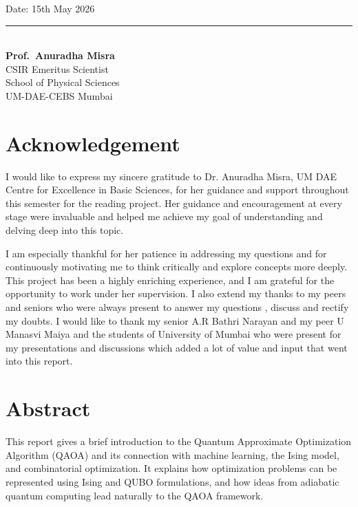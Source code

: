 \documentclass[english,12pt,a4paper]{report}
\begin{document}
	\noindent Date: 15th May 2026
	
	\begin{flushright}
		\rule{5cm}{0.4pt}\\
		\textbf{Prof.\ Anuradha Misra}\\
		CSIR Emeritus Scientist\\
		School of Physical Sciences\\
		UM-DAE-CEBS Mumbai
	\end{flushright}
	\newpage
	
	\section*{\huge Acknowledgement}
	{\large	\hspace{1.15em} I would like to express my sincere gratitude to Dr. Anuradha Misra, UM DAE Centre for Excellence in Basic Sciences, for her guidance and support throughout this semester for the reading project. Her guidance and encouragement at every stage were invaluable and helped me achieve my goal of understanding and delving deep into this topic.
		
		I am especially thankful for her patience in addressing my questions and for continuously motivating me to think critically and explore concepts more deeply. This project has been a highly enriching experience, and I am grateful for the opportunity to work under her supervision. I also extend my thanks to my peers and seniors who were always present to answer my questions , discuss and rectify my doubts. I would like to thank my senior A.R Bathri Narayan and my peer U Manasvi Maiya and the students of University of Mumbai who were present for my presentations and discussions which added a lot of value and input that went into this report.
	}
	\newpage
	\section*{\centering  \LARGE Abstract}
	\hspace{1.15em}This report gives a brief introduction to the Quantum Approximate Optimization Algorithm (QAOA) and its connection with machine learning, the Ising model, and combinatorial optimization. It explains how optimization problems can be represented using Ising and QUBO formulations, and how ideas from adiabatic quantum computing lead naturally to the QAOA framework.
	
\end{document}
